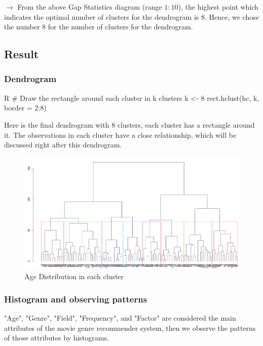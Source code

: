     $\rightarrow$ From the above Gap Statistics diagram (range $1 : 10$), the highest point which indicates the optimal number of clusters for the dendrogram is 8. Hence, we chose the number 8 for the number of clusters for the dendrogram. 
    

\subsection{Result}
    \subsubsection{Dendrogram}


    \begin{code}{R}
        # Draw the rectangle around each cluster in k clusters
        k <- 8
        rect.hclust(hc, k, border = 2:8)
    \end{code}
    
    Here is the final dendrogram with 8 clusters, each cluster has a rectangle around it. The observations in each cluster have a close relationship, which will be discussed right after this dendrogram.

    \begin{figure}[H]
        \centering
            \includegraphics[scale=0.4]{graphics/dummy/dendrogram/dendrogram2.png}
        \caption{Age Distribution in each cluster}
    \end{figure}


    \subsubsection{Histogram and observing patterns}
 "Age", "Genre", "Field", "Frequency", and "Factor" are considered the main attributes of the movie genre recommender system, then we observe the patterns of those attributes by histograms.


